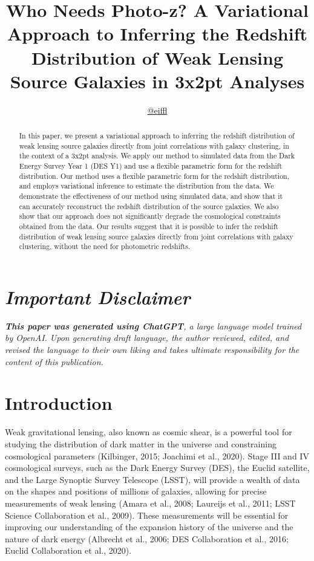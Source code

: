 \documentclass[twocolumn]{aastex631}
\begin{document}
\title{Who Needs Photo-z? A Variational Approach to Inferring the Redshift Distribution of Weak Lensing Source Galaxies in 3x2pt Analyses}

\author{\href{https://github.com/EiffL}{@eiffl}}

\begin{abstract}
In this paper, we present a variational approach to inferring the redshift distribution of weak lensing source galaxies directly from joint correlations with galaxy clustering, in the context of a 3x2pt analysis. We apply our method to simulated data from the Dark Energy Survey Year 1 (DES Y1) and use a flexible parametric form for the redshift distribution. Our method uses a flexible parametric form for the redshift distribution, and employs variational inference to estimate the distribution from the data. We demonstrate the effectiveness of our method using simulated data, and show that it can accurately reconstruct the redshift distribution of the source galaxies. We also show that our approach does not significantly degrade the cosmological constraints obtained from the data. Our results suggest that it is possible to infer the redshift distribution of weak lensing source galaxies directly from joint correlations with galaxy clustering, without the need for photometric redshifts.
\end{abstract}

\section*{\textit{\textbf{Important Disclaimer}}}
\textit{\textbf{This paper was generated using ChatGPT}, a large language model trained by OpenAI. Upon generating draft language, the author reviewed, edited, and revised the language to their own liking and takes ultimate responsibility for the content of this publication.}


\section{Introduction}
\label{sec:intro}

Weak gravitational lensing, also known as cosmic shear, is a powerful tool for studying the distribution of dark matter in the universe and constraining cosmological parameters (Kilbinger, 2015; Joachimi et al., 2020). Stage III and IV cosmological surveys, such as the Dark Energy Survey (DES), the Euclid satellite, and the Large Synoptic Survey Telescope (LSST), will provide a wealth of data on the shapes and positions of millions of galaxies, allowing for precise measurements of weak lensing (Amara et al., 2008; Laureijs et al., 2011; LSST Science Collaboration et al., 2009). These measurements will be essential for improving our understanding of the expansion history of the universe and the nature of dark energy (Albrecht et al., 2006; DES Collaboration et al., 2016; Euclid Collaboration et al., 2020).
\end{document}

